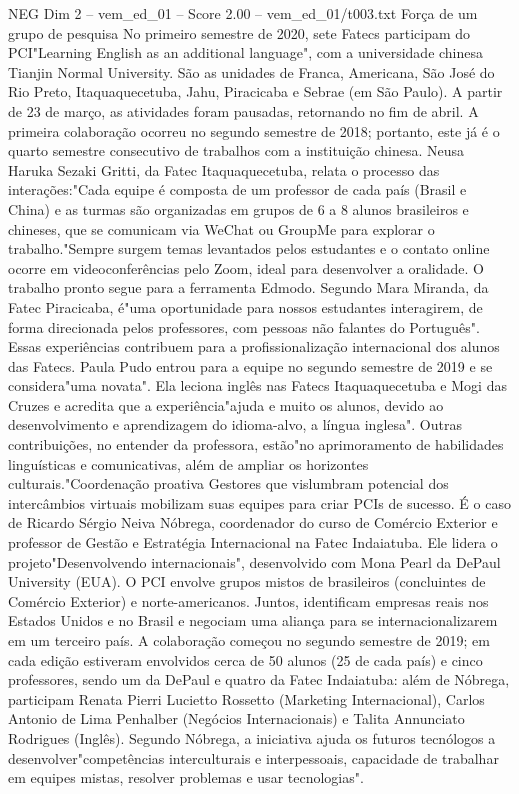 \begin{textsample}{NEG Dim 2 – vem\_ed\_01 – Score 2.00 – vem\_ed\_01/t003.txt}  \label{ex:f2_neg_127}
Força de um grupo de pesquisa No primeiro semestre de 2020, sete Fatecs participam do PCI"Learning English as an additional language", com a universidade chinesa Tianjin Normal University.
São as unidades de Franca, Americana, São José do Rio Preto, Itaquaquecetuba, Jahu, Piracicaba e Sebrae (em São Paulo).
A partir de 23 de março, as atividades foram pausadas, retornando no fim de abril.
A primeira colaboração ocorreu no segundo semestre de 2018; portanto, este já é o quarto semestre consecutivo de trabalhos com a instituição chinesa.
Neusa Haruka Sezaki Gritti, da Fatec Itaquaquecetuba, relata o processo das interações:"Cada equipe é composta de um professor de cada país (Brasil e China) e as turmas são organizadas em grupos de 6 a 8 alunos brasileiros e chineses, que se comunicam via WeChat ou GroupMe para explorar o trabalho."Sempre surgem temas levantados pelos estudantes e o contato online ocorre em videoconferências pelo Zoom, ideal para desenvolver a oralidade.
O trabalho pronto segue para a ferramenta Edmodo.
Segundo Mara Miranda, da Fatec Piracicaba, é"uma oportunidade para nossos estudantes interagirem, de forma direcionada pelos professores, com pessoas não falantes do Português".
Essas experiências contribuem para a profissionalização internacional dos alunos das Fatecs.
Paula Pudo entrou para a equipe no segundo semestre de 2019 e se considera"uma novata".
Ela leciona inglês nas Fatecs Itaquaquecetuba e Mogi das Cruzes e acredita que a experiência"ajuda e muito os alunos, devido ao desenvolvimento e aprendizagem do idioma-alvo, a língua inglesa".
Outras contribuições, no entender da professora, estão"no aprimoramento de habilidades linguísticas e comunicativas, além de ampliar os horizontes culturais."Coordenação proativa Gestores que vislumbram potencial dos intercâmbios virtuais mobilizam suas equipes para criar PCIs de sucesso.
É o caso de Ricardo Sérgio Neiva Nóbrega, coordenador do curso de Comércio Exterior e professor de Gestão e Estratégia Internacional na Fatec Indaiatuba.
Ele lidera o projeto"Desenvolvendo internacionais", desenvolvido com Mona Pearl da DePaul University (EUA).
O PCI envolve grupos mistos de brasileiros (concluintes de Comércio Exterior) e norte-americanos.
Juntos, identificam empresas reais nos Estados Unidos e no Brasil e negociam uma aliança para se internacionalizarem em um terceiro país.
A colaboração começou no segundo semestre de 2019; em cada edição estiveram envolvidos cerca de 50 alunos (25 de cada país) e cinco professores, sendo um da DePaul e quatro da Fatec Indaiatuba: além de Nóbrega, participam Renata Pierri Lucietto Rossetto (Marketing Internacional), Carlos Antonio de Lima Penhalber (Negócios Internacionais) e Talita Annunciato Rodrigues (Inglês).
Segundo Nóbrega, a iniciativa ajuda os futuros tecnólogos a desenvolver"competências interculturais e interpessoais, capacidade de trabalhar em equipes mistas, resolver problemas e usar tecnologias".

\end{textsample}
